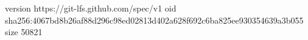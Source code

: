 version https://git-lfs.github.com/spec/v1
oid sha256:4067bd8b26af88d296c98ed02813d402a628f692c6ba825ee930354639a3b055
size 50821
